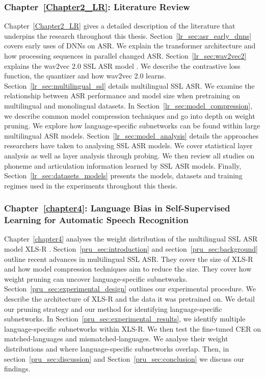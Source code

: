 \subsubsection{Chapter~\ref{Chapter2_LR}: Literature Review}
Chapter~\ref{Chapter2_LR} gives a detailed description of the literature that underpins the research throughout this thesis. Section~\ref{lr_sec:asr_early_dnns} covers early uses of DNNs on ASR. We explain the transformer architecture and how processing sequences in parallel changed ASR. Section~\ref{lr_sec:wav2vec2} explains the wav2vec 2.0 SSL ASR model \cite{wav2vec}. We describe the contrastive loss function, the quantizer and how wav2vec 2.0 learns. Section~\ref{lr_sec:multilingual_ssl} details multilingual SSL ASR. We examine the relationship between ASR performance and model size when pretraining on multilingual and monolingual datasets. In Section~\ref{lr_sec:model_compression}, we describe common model compression techniques and go into depth on weight pruning. We explore how language-specific subnetworks can be found within large multilingual ASR models. Section~\ref{lr_sec:model_analysis} details the approaches researchers have taken to analysing SSL ASR models. We cover statistical layer analysis as well as layer analysis through probing. We then review all studies on phoneme and articulation information learned by SSL ASR models. Finally, Section~\ref{lr_sec:datasets_models} presents the models, datasets and training regimes used in the experiments throughout this thesis.

\subsubsection{Chapter~\ref{chapter4}: Language Bias in Self-Supervised Learning for Automatic Speech Recognition}
Chapter~\ref{chapter4} analyses the weight distribution of the multilingual SSL ASR model XLS-R \cite{babu2021xlsr}. Section~\ref{pru_sec:introduction} and section~\ref{pru_sec:background} outline recent advances in multilingual SSL ASR. They cover the size of XLS-R and how model compression techniques aim to reduce the size. They cover how weight pruning can uncover language-specific subnetworks. Section~\ref{pru_sec:experimental_design} outlines our experimental procedure. We describe the architecture of XLS-R and the data it was pretrained on. We detail our pruning strategy and our method for identifying language-specific subnetworks. In Section~\ref{pru_sec:experimental_results}, we identify multiple language-specific subnetworks within XLS-R. We then test the fine-tuned CER on matched-languages and mismatched-languages. We analyse their weight distributions and where language-specific subnetworks overlap. Then, in section~\ref{pru_sec:discussion} and Section~\ref{pru_sec:conclusion} we discuss our findings. 

